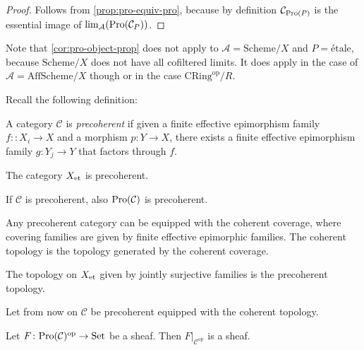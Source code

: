 \begin{proof}
    Follows from \ref{prop:pro-equiv-pro}, because by definition $\mathcal{C}_{\mathrm{Pro}(P)}$ is
    the essential image of $\lim_{\mathcal{A}}(\mathrm{Pro}(\mathcal{C}_{P}))$.
\end{proof}

Note that \ref{cor:pro-object-prop} does not apply to $\mathcal{A} = \mathrm{Scheme} / X$
and $P = \mathrm{étale}$, because $\mathrm{Scheme} / X$ does not have all cofiltered limits. It
does apply in the case of $\mathcal{A} = \mathrm{AffScheme} / X$ though or in the case
$\mathrm{CRing}^{\mathrm{op}} / R$.

Recall the following definition:

\begin{definition}
    A category $\mathcal{C}$ is \emph{precoherent} if given a finite effective epimorphism family
    $f\colon \colon X_i \to X$ and a morphism $p\colon Y \to X$, there exists a finite effective epimorphism family
    $g\colon Y_j \to Y$ that factors through $f$.
\end{definition}

\begin{lemma}
    The category $X_{\mathrm{et}}$ is precoherent.
    \label{lemma:et-precoherent}
\end{lemma}

\begin{proposition}
    If $\mathcal{C}$ is precoherent, also $\mathrm{Pro}(\mathcal{C})$ is precoherent.
    \label{prop:pro-precoherent}
\end{proposition}

Any precoherent category can be equipped with the coherent coverage, where covering families are given by
finite effective epimorphic families. The coherent topology is the topology generated by the coherent coverage.

\begin{lemma}
    The topology on $X_{\mathrm{et}}$ given by jointly surjective families is the precoherent topology.
\end{lemma}

Let from now on $\mathcal{C}$ be precoherent equipped with the coherent topology.

\begin{proposition}
    Let $F \colon \mathrm{Pro}(\mathcal{C})^{\mathrm{op}} \to \mathrm{Set}$ be a sheaf. Then
    $F|_{\mathcal{C}^{\mathrm{op}}}$ is a sheaf.
    \label{prop:sheaf-pro-restrict}
\end{proposition}

